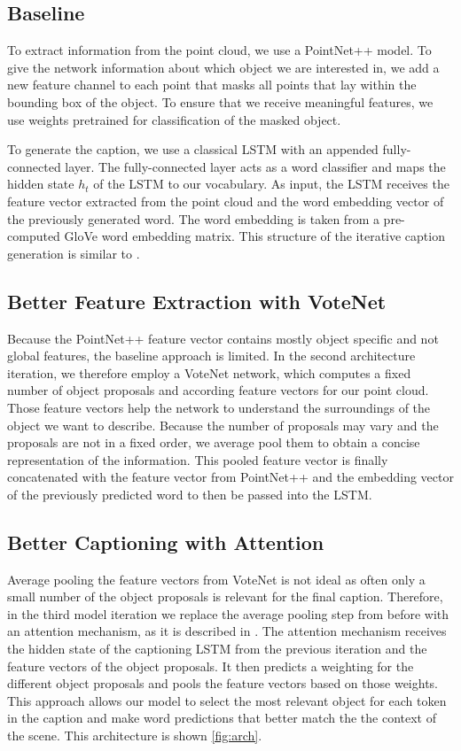 \documentclass[10pt,twocolumn,letterpaper]{article}
\begin{document}
\subsection{Baseline}

To extract information from the point cloud, we use a PointNet++ \cite{qi2017pointnet++} model. To give the network information about which object we are interested in, we add a new feature channel to each point that masks all points that lay within the bounding box of the object. To ensure that we receive meaningful features, we use weights pretrained for classification of the masked object.

To generate the caption, we use a classical LSTM with an appended fully-connected layer. The fully-connected layer acts as a word classifier and maps the hidden state $h_{t}$ of the LSTM to our vocabulary. As input, the LSTM receives the feature vector extracted from the point cloud and the word embedding vector of the previously generated word. The word embedding is taken from a pre-computed GloVe \cite{pennington2014glove} word embedding matrix. This structure of the iterative caption generation is similar to \cite{xu2015show}.

\subsection{Better Feature Extraction with VoteNet}

Because the PointNet++ feature vector contains mostly object specific and not global features, the baseline approach is limited. In the second architecture iteration, we therefore employ a VoteNet \cite{qi2019deep} network, which computes a fixed number of object proposals and according feature vectors for our point cloud. Those feature vectors help the network to understand the surroundings of the object we want to describe. Because the number of proposals may vary and the proposals are not in a fixed order, we average pool them to obtain a concise representation of the information. This pooled feature vector is finally concatenated with the feature vector from PointNet++ and the embedding vector of the previously predicted word to then be passed into the LSTM.

\subsection{Better Captioning with Attention}

Average pooling the feature vectors from VoteNet is not ideal as often only a small number of the object proposals is relevant for the final caption. Therefore, in the third model iteration we replace the average pooling step from before with an attention mechanism, as it is described in \cite{xu2015show}. The attention mechanism receives the hidden state of the captioning LSTM from the previous iteration and the feature vectors of the object proposals. It then predicts a weighting for the different object proposals and pools the feature vectors based on those weights. This approach allows our model to select the most relevant object for each token in the caption and make word predictions that better match the the context of the scene. This architecture is shown \autoref{fig:arch}.
\end{document}
